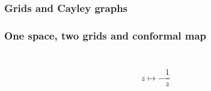 \documentclass[aspectratio=169]{beamer}
\begin{document}
\begin{frame}
    \frametitle{Grids and Cayley graphs}
\end{frame}

\begin{frame}
    \frametitle{One space, two grids and conformal map}
    \begin{columns}
        \begin{column}{0.5\textwidth}
            \begin{figure}[ht]\centering
            \end{figure}
        \end{column}
        \begin{column}{0.5\textwidth}
            \begin{figure}[ht]\centering
            \end{figure}
        \end{column}
    \end{columns}
    \begin{center}
        \[
            z \mapsto - \frac{1}{z}
        \]
    \end{center}
\end{frame}
\end{document}

